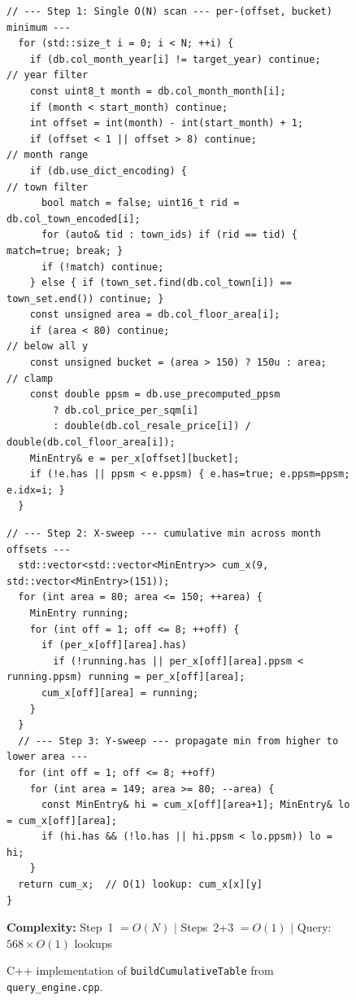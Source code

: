 \documentclass[11pt,a4paper]{article}
\begin{document}
\begin{figure}[H]
\begin{minipage}[t]{0.54\linewidth}
\begin{lstlisting}[name=cumulTable]
  // --- Step 1: Single O(N) scan --- per-(offset, bucket) minimum ---
  for (std::size_t i = 0; i < N; ++i) {
    if (db.col_month_year[i] != target_year) continue;           // year filter
    const uint8_t month = db.col_month_month[i];
    if (month < start_month) continue;
    int offset = int(month) - int(start_month) + 1;
    if (offset < 1 || offset > 8) continue;                      // month range
    if (db.use_dict_encoding) {                                   // town filter
      bool match = false; uint16_t rid = db.col_town_encoded[i];
      for (auto& tid : town_ids) if (rid == tid) { match=true; break; }
      if (!match) continue;
    } else { if (town_set.find(db.col_town[i]) == town_set.end()) continue; }
    const unsigned area = db.col_floor_area[i];
    if (area < 80) continue;                                      // below all y
    const unsigned bucket = (area > 150) ? 150u : area;           // clamp
    const double ppsm = db.use_precomputed_ppsm
        ? db.col_price_per_sqm[i]
        : double(db.col_resale_price[i]) / double(db.col_floor_area[i]);
    MinEntry& e = per_x[offset][bucket];
    if (!e.has || ppsm < e.ppsm) { e.has=true; e.ppsm=ppsm; e.idx=i; }
  }
\end{lstlisting}
\end{minipage}\hfill
\begin{minipage}[t]{0.44\linewidth}
\begin{lstlisting}[name=cumulTable]
  // --- Step 2: X-sweep --- cumulative min across month offsets ---
  std::vector<std::vector<MinEntry>> cum_x(9, std::vector<MinEntry>(151));
  for (int area = 80; area <= 150; ++area) {
    MinEntry running;
    for (int off = 1; off <= 8; ++off) {
      if (per_x[off][area].has)
        if (!running.has || per_x[off][area].ppsm < running.ppsm) running = per_x[off][area];
      cum_x[off][area] = running;
    }
  }
  // --- Step 3: Y-sweep --- propagate min from higher to lower area ---
  for (int off = 1; off <= 8; ++off)
    for (int area = 149; area >= 80; --area) {
      const MinEntry& hi = cum_x[off][area+1]; MinEntry& lo = cum_x[off][area];
      if (hi.has && (!lo.has || hi.ppsm < lo.ppsm)) lo = hi;
    }
  return cum_x;  // O(1) lookup: cum_x[x][y]
}
\end{lstlisting}
\end{minipage}

\vspace{-2pt}
\centering\small
\textbf{Complexity:} Step~1 $= O(N)$ $|$ Steps~2+3 $= O(1)$ $|$ Query: $568 \times O(1)$ lookups 
\caption{C++ implementation of \texttt{buildCumulativeTable} from \texttt{query\_engine.cpp}.}\label{fig:cumtable}
\end{figure}
\end{document}
